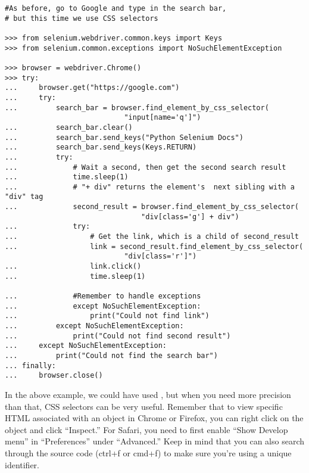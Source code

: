 \begin{lstlisting}
#As before, go to Google and type in the search bar,
# but this time we use CSS selectors

>>> from selenium.webdriver.common.keys import Keys
>>> from selenium.common.exceptions import NoSuchElementException

>>> browser = webdriver.Chrome()
>>> try:
...		browser.get("https://google.com")
...		try:
...			search_bar = browser.find_element_by_css_selector(
							"input[name='q']")
...			search_bar.clear()
...			search_bar.send_keys("Python Selenium Docs")
...			search_bar.send_keys(Keys.RETURN)
...			try:	
...				# Wait a second, then get the second search result
...				time.sleep(1)
...				# "+ div" returns the element's  next sibling with a "div" tag
...				second_result = browser.find_element_by_css_selector(
								"div[class='g'] + div")
...				try:
...					# Get the link, which is a child of second_result
...					link = second_result.find_element_by_css_selector(
							"div[class='r']")
...					link.click()
...					time.sleep(1)

...				#Remember to handle exceptions
...				except NoSuchElementException:
...					print("Could not find link")
...			except NoSuchElementException:
...				print("Could not find second result")
...		except NoSuchElementException:
...			print("Could not find the search bar")
...	finally:
...		browser.close()

\end{lstlisting}

In the above example, we could have used , but when you need more precision than that, CSS selectors can be very useful. 
Remember that to view specific HTML associated with an object in Chrome or Firefox, you can right click on the object and click ``Inspect.''
For Safari, you need to first enable ``Show Develop menu'' in ``Preferences'' under ``Advanced.''
Keep in mind that you can also search through the source code (ctrl+f or cmd+f) to make sure you're using a unique identifier.

